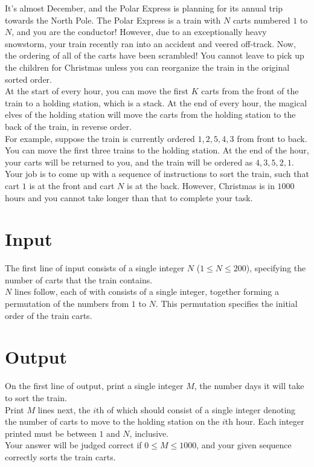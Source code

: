 
\noindent It's almost December, and the Polar Express is planning for its annual trip towards the North Pole. The Polar Express is a train with $N$ carts numbered $1$ to $N$, and you are the conductor! However, due to an exceptionally heavy snowstorm, your train recently ran into an accident and veered off-track. Now, the ordering of all of the carts have been scrambled! You cannot leave to pick up the children for Christmas unless you can reorganize the train in the original sorted order.\\

At the start of every hour, you can move the first $K$ carts from the front of the train to a holding station, which is a stack. At the end of every hour, the magical elves of the holding station will move the carts from the holding station to the back of the train, in reverse order.\\

For example, suppose the train is currently ordered $1, 2, 5, 4, 3$ from front to back. You can move the first three trains to the holding station. At the end of the hour, your carts will be returned to you, and the train will be ordered as $4, 3, 5, 2, 1$.\\

Your job is to come up with a sequence of instructions to sort the train, such that cart $1$ is at the front and cart $N$ is at the back. However, Christmas is in $1000$ hours and you cannot take longer than that to complete your task.

\section*{Input}
The first line of input consists of a single integer $N$ ($1 \leq N \leq 200$), specifying the number of carts that the train contains.\\
$N$ lines follow, each of with consists of a single integer, together forming a permutation of the numbers from $1$ to $N$. This permutation specifies the initial order of the train carts.

\section*{Output}
On the first line of output, print a single integer $M$, the number days it will take to sort the train.\\
Print $M$ lines next, the $i$th of which should consist of a single integer denoting the number of carts to move to the holding station on the $i$th hour. Each integer printed must be between $1$ and $N$, inclusive.\\
Your answer will be judged correct if $0 \leq M \leq 1000$, and your given sequence correctly sorts the train carts.
